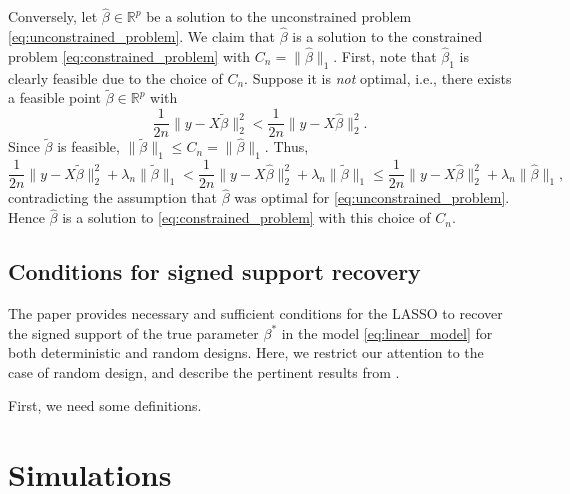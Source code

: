 \documentclass[letterpaper,12pt]{article}
\newcommand{\norm}[1]{\lVert#1\rVert}
\begin{document}
Conversely, let $\hat{\beta} \in \mathbb{R}^p$ be a solution to the
unconstrained problem \eqref{eq:unconstrained_problem}. We claim that
$\hat{\beta}$ is a solution to the constrained problem
\eqref{eq:constrained_problem} with $C_n =
\norm{\hat{\beta}}_1$. First, note that $\hat{\beta}_1$ is clearly
feasible due to the choice of $C_n$. Suppose it is \emph{not} optimal,
i.e., there exists a feasible point $\tilde{\beta} \in \mathbb{R}^p$
with
\begin{equation*}
  \frac{1}{2n} \norm{y - X\tilde{\beta}}_2^2
    < \frac{1}{2n} \norm{y - X\hat{\beta}}_2^2.
\end{equation*}
Since $\tilde{\beta}$ is feasible,
$\norm{\tilde{\beta}}_1 \leq C_n = \norm{\hat{\beta}}_1$. Thus,
\begin{equation*}
  \frac{1}{2n} \norm{y - X\tilde{\beta}}_2^2 + \lambda_n \norm{\tilde{\beta}}_1
    < \frac{1}{2n} \norm{y - X\hat{\beta}}_2^2
      + \lambda_n \norm{\tilde{\beta}}_1
    \leq \frac{1}{2n} \norm{y - X\hat{\beta}}_2^2
      + \lambda_n \norm{\hat{\beta}}_1,
\end{equation*}
contradicting the assumption that $\hat{\beta}$ was optimal for
\eqref{eq:unconstrained_problem}. Hence $\hat{\beta}$ is a solution to
\eqref{eq:constrained_problem} with this choice of $C_n$.

\subsection*{Conditions for signed support recovery}

The paper \cite{wainwright06} provides necessary and sufficient
conditions for the LASSO to recover the signed support of the true
parameter $\beta^\ast$ in the model \eqref{eq:linear_model} for both
deterministic and random designs. Here, we restrict our attention to
the case of random design, and describe the pertinent results from
\cite{wainwright06}.

First, we need some definitions. %

\begin{customthm}{3} \label{sufficiency}
\end{customthm}

\begin{customthm}{4} \label{necessity}
\end{customthm}

\section*{Simulations}
\end{document}

